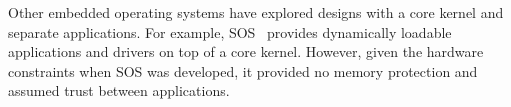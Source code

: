 Other embedded operating systems have explored designs with a core kernel and
separate applications. For example, SOS~\cite{han05sos} provides dynamically
loadable applications and drivers on top of a core kernel. However, given
the hardware constraints when SOS was developed, it provided no memory protection
and assumed trust between applications.